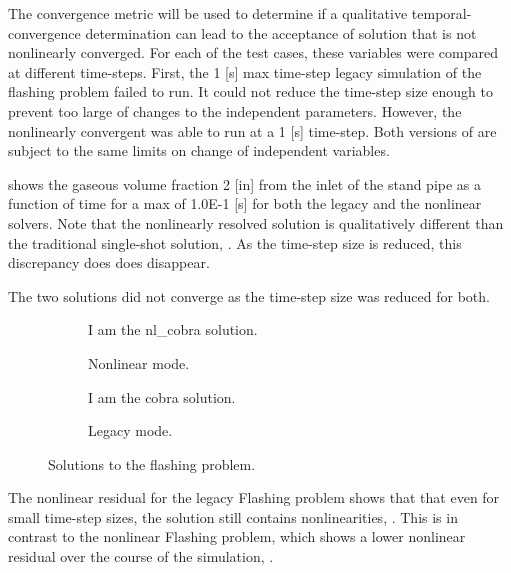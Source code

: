 
The convergence metric will be used to determine if a qualitative temporal-convergence determination can lead to the acceptance of solution that is not nonlinearly converged.
For each of the test cases, these variables were compared at different time-steps.
First, the 1 [s] max time-step legacy simulation of the flashing problem failed to run.
It could not reduce the time-step size enough to prevent too large of changes to the independent parameters.
However, the nonlinearly convergent \cobra{} was able to run at a 1 [s] time-step.
Both versions of \cobra{} are subject to the same limits on change of independent variables.

 shows the gaseous volume fraction 2 [in] from the inlet of the stand pipe as a function of time for a max \dt{} of 1.0E-1 [s] for both the legacy and the nonlinear solvers.
Note that the nonlinearly resolved solution is qualitatively different than the traditional single-shot solution, .
As the time-step size is reduced, this discrepancy does does disappear.

The two solutions did not converge as the time-step size was reduced for both.

\begin{figure}
        \centering
        \begin{subfigure}[b]{0.48\textwidth}
                \centering
				I am the nl\_cobra solution.
                \caption{Nonlinear mode.}
                \label{fig:gull}
        \end{subfigure}%
        \begin{subfigure}[b]{0.48\textwidth}
                \centering
				I am the cobra solution.
                \caption{Legacy mode.}
                \label{fig:tiger}
        \end{subfigure}
        \caption{Solutions to the flashing problem.}
        \label{fig:flashing_solution}
\end{figure}

The nonlinear residual for the legacy Flashing problem shows that that even for small time-step sizes, the solution still contains nonlinearities, .
This is in contrast to the nonlinear Flashing problem, which shows a lower nonlinear residual over the course of the simulation, .

